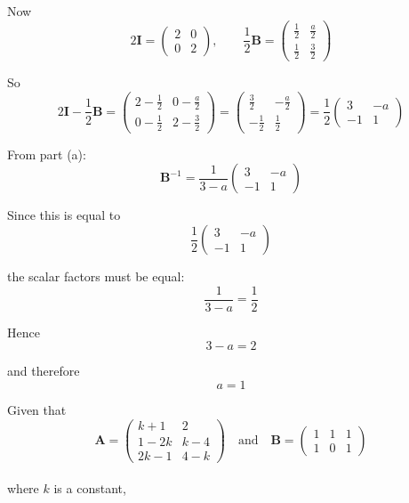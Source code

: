 \documentclass[leqno]{article}
\begin{document}
\begin{enumerate}[
  label=\textbf{\arabic*.},
  leftmargin=*,
  topsep=0pt,
  partopsep=0pt,
  parsep=0pt
]
\begin{djsSolution}
\begin{enumerate}[label=\textbf{(\alph*)}]
Now
\[
2\mathbf{I}=\begin{pmatrix}2&0\\0&2\end{pmatrix},
\qquad
\frac12 \mathbf{B}=\begin{pmatrix}\frac12&\frac a2\\[2pt]\frac12&\frac32\end{pmatrix}
\]

So
\[
2\mathbf{I}-\frac12 \mathbf{B}
=
\begin{pmatrix}
2-\frac12 & 0-\frac a2\\[4pt]
0-\frac12 & 2-\frac32
\end{pmatrix}
=
\begin{pmatrix}
\frac32 & -\frac a2\\[4pt]
-\frac12 & \frac12
\end{pmatrix}
=
\frac12
\begin{pmatrix}
3 & -a\\
-1 & 1
\end{pmatrix}
\]

From part (a):
\[
\mathbf{B}^{-1}=\frac{1}{3-a}\begin{pmatrix}3&-a\\-1&1\end{pmatrix}
\]

Since this is equal to
\[
\frac12\begin{pmatrix}3&-a\\-1&1\end{pmatrix}
\]

the scalar factors must be equal:
\[
\frac{1}{3-a}=\frac12
\]

Hence
\[
3-a=2
\]

and therefore
\[
a=1
\]
\end{enumerate}
\end{djsSolution}


\newpage

\questionitem

Given that
\[
\mathbf{A}=\begin{pmatrix}k+1 & 2\\ 1-2k & k-4\\ 2k-1 & 4-k\end{pmatrix}
\quad \text{and} \quad
\mathbf{B}=\begin{pmatrix}1 & 1 & 1\\ 1 & 0 & 1\end{pmatrix}
\] \\
where $k$ is a constant, \\


\end{enumerate}
\end{document}
